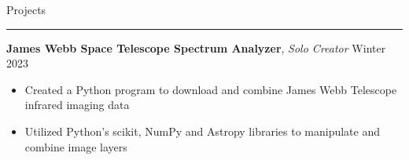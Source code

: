 \documentclass[11pt]{article}
\newcommand{\sectiontitle}[1]{
    \noindent\Large#1
    \newline
    \vspace{-0.18in}
    \hrule   
}
\newcommand{\occupation}[4]{
    \topitemspacing
    \normalsize
    \noindent\textbf{#1}
    \hfill
    \noindent#3
    \newline
    \noindent\textit{#2} | \textit{#4}
    \toplistspacing
}
\newcommand{\project}[3]{
    \topitemspacing
    \normalsize
    \noindent\textbf{#1}, \textit{#2}
    \hfill
    \noindent#3
    \toplistspacing
}
\newcommand{\sectionendspace}{
    \vspace{0.1in}
}
\newcommand{\toplistspacing}{
    \vspace{0.04in}
}
\newcommand{\topitemspacing}{
    \vspace{0.1in}
}
\begin{document}
    \sectionendspace
    \sectiontitle{Projects}
    \project{James Webb Space Telescope Spectrum Analyzer}{Solo Creator}{Winter 2023}
    \begin{itemize}[noitemsep,nolistsep]
        \item Created a Python program to download and combine James Webb Telescope infrared imaging data
        \item Utilized Python's scikit, NumPy and Astropy libraries to  manipulate and combine image layers
    \end{itemize}
\end{document}
